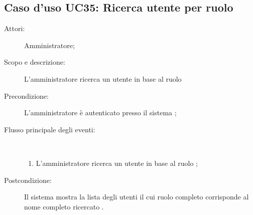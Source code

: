 \subsection{Caso d'uso UC35: Ricerca utente per ruolo}\begin{description}
\item[Attori:] Amministratore;
\item[Scopo e descrizione:] L'amministratore ricerca un utente in base al ruolo 

      \item[Precondizione:] L'amministratore è autenticato presso il sistema
;

        \item[Flusso principale degli eventi:] \ 
 \begin{enumerate}
          \item L'amministratore ricerca un utente in base al ruolo 
;

      \end{enumerate}
    \item[Postcondizione:] Il sistema mostra la lista degli utenti il cui ruolo completo corrisponde al nome completo ricercato
.
  \end{description}
 